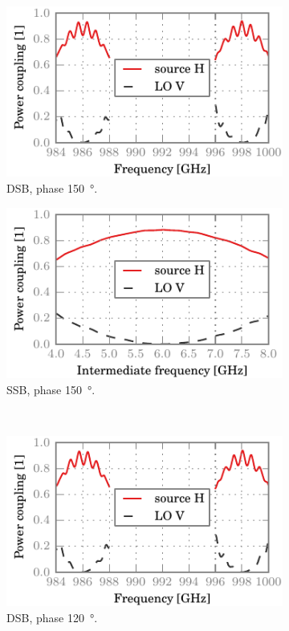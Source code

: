 \begin{figure}[hbtp]
    \begin{subfigure}[b]{.5\textwidth}
        \includegraphics{chapter_3/10_phase_a_h_dsb}%
        \caption{DSB, phase \SI{150}{\degree}.}
    \end{subfigure}%
    \begin{subfigure}[b]{.5\textwidth}
        \includegraphics{chapter_3/10_phase_a_h_ssb}%
        \caption{SSB, phase \SI{150}{\degree}.}
    \end{subfigure}%
    \\
    \begin{subfigure}[b]{.5\textwidth}
        \includegraphics{chapter_3/11_phase_b_h_dsb}%
        \caption{DSB, phase \SI{120}{\degree}.}
    \end{subfigure}%
    \begin{subfigure}[b]{.5\textwidth}

\end{subfigure}
\end{figure}
